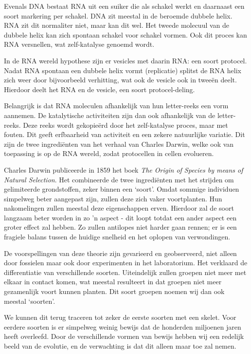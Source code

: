 \documentclass{article}
\begin{document}
        Evenals DNA bestaat RNA uit een suiker die als schakel werkt en daarnaast een soort markering per schakel. DNA zit meestal in de beroemde dubbele helix. RNA zit dit normaliter niet, maar kan dit wel. Het tweede molecuul van de dubbele helix kan zich spontaan schakel voor schakel vormen. Ook dit proces kan RNA versnellen, wat zelf-katalyse genoemd wordt. 
        
        In de RNA wereld hypothese zijn er vesicles met daarin RNA: een soort protocel. Nadat RNA spontaan een dubbele helix vormt (replicatie) splitst de RNA helix zich weer door bijvoorbeeld verhitting, wat ook de vesicle ook in twee\"en deelt. Hierdoor deelt het RNA en de vesicle, een soort protocel-deling.
        
        Belangrijk is dat RNA moleculen afhankelijk van hun letter-reeks een vorm aannemen. De katalytische activiteiten zijn dan ook afhankelijk van de letter-reeks. Deze reeks wordt gekopie\"erd door het zelf-katalyse proces, maar met fouten. Dit geeft erfbaarheid van activiteit en een zekere natuurlijke variatie. Dit zijn de twee ingredi\"enten van het verhaal van Charles Darwin, welke ook van toepassing is op de RNA wereld, zodat protocellen in cellen evolueren. 
    
        Charles Darwin publiceerde in 1859 het boek \emph{The Origin of Species by means of Natural Selection}. Het combineerde de twee ingredi\"enten met het strijden om gelimiteerde grondstoffen, zeker binnen een `soort'. Omdat sommige individuen simpelweg beter aangepast zijn, zullen deze zich vaker voortplanten. Hun nakomelingen zullen meestal deze eigenschappen erven. Hierdoor zal de soort langzaam beter worden in zo 'n aspect - dit loopt totdat een ander aspect een groter effect zal hebben. Zo zullen antilopes niet harder gaan rennen; er is een fragiele balans tussen de huidige snelheid en het oplopen van verwondingen. 
        
        De voorspellingen van deze theorie zijn gevarieerd en geobserveerd, niet alleen door fossielen maar ook door experimenten in het laboratorium. Het verklaard de differentiatie van verschillende soorten. Uiteindelijk zullen groepen niet meer met elkaar in contact komen, wat meestal resulteert in dat groepen niet meer gezamenlijk voort kunnen planten. Dit soort groepen noemen wij dan ook meestal `soorten'.
        
        We kunnen dit terug traceren tot zeker de eerste soorten met een skelet. Voor eerdere soorten is er simpelweg weinig bewijs dat de honderden miljoenen jaren heeft overleefd. Door de verschillende vormen van bewijs hebben wij een redelijk beeld van de evolutie, en de verwachting is dat dit alleen maar toe zal nemen.
\end{document}
